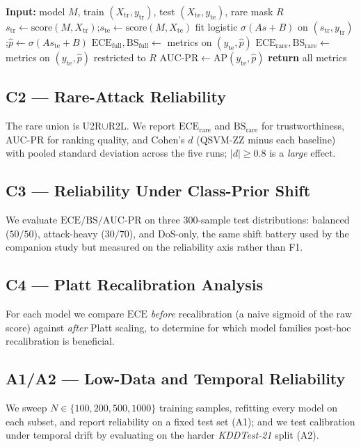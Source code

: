 \documentclass[journal]{IEEEtran}
\newcommand{\ZZ}{\textsc{ZZ}}
\newcommand{\QSVM}{QSVM-\ZZ}
\newcommand{\ECE}{\mathrm{ECE}}
\newcommand{\Brier}{\mathrm{BS}}
\begin{document}
\begin{algorithm}[t]
\caption{Uniform Platt probability and reliability metrics}
\label{alg:platt}
\begin{algorithmic}[1]
\STATE \textbf{Input:} model $M$, train $(X_{\mathrm{tr}},y_{\mathrm{tr}})$, test $(X_{\mathrm{te}},y_{\mathrm{te}})$, rare mask $R$
\STATE $s_{\mathrm{tr}}\!\gets\!\mathrm{score}(M,X_{\mathrm{tr}})$;\quad $s_{\mathrm{te}}\!\gets\!\mathrm{score}(M,X_{\mathrm{te}})$
\STATE fit logistic $\sigma(As{+}B)$ on $(s_{\mathrm{tr}},y_{\mathrm{tr}})$;\quad $\hat{p}\!\gets\!\sigma(As_{\mathrm{te}}{+}B)$
\STATE $\ECE_{\mathrm{full}},\Brier_{\mathrm{full}}\!\gets\!$ metrics on $(y_{\mathrm{te}},\hat{p})$
\STATE $\ECE_{\mathrm{rare}},\Brier_{\mathrm{rare}}\!\gets\!$ metrics on $(y_{\mathrm{te}},\hat{p})$ restricted to $R$
\STATE $\mathrm{AUC\text{-}PR}\!\gets\!\mathrm{AP}(y_{\mathrm{te}},\hat{p})$
\STATE \textbf{return} all metrics
\end{algorithmic}
\end{algorithm}

\subsection{C2 --- Rare-Attack Reliability}
The rare union is U2R$\cup$R2L. We report $\ECE_{\text{rare}}$ and
$\Brier_{\text{rare}}$ for trustworthiness, AUC-PR for ranking quality,
and Cohen's $d$ (\QSVM{} minus each baseline) with pooled standard
deviation across the five runs; $|d|\ge0.8$ is a \emph{large} effect.

\subsection{C3 --- Reliability Under Class-Prior Shift}
We evaluate $\ECE/\Brier/\text{AUC-PR}$ on three $300$-sample test
distributions: balanced ($50/50$), attack-heavy ($30/70$), and
DoS-only, the same shift battery used by the companion study but measured
on the reliability axis rather than F1.

\subsection{C4 --- Platt Recalibration Analysis}
For each model we compare $\ECE$ \emph{before} recalibration (a naive
sigmoid of the raw score) against \emph{after} Platt scaling, to
determine for which model families post-hoc recalibration is beneficial.

\subsection{A1/A2 --- Low-Data and Temporal Reliability}
We sweep $N\in\{100,200,500,1000\}$ training samples, refitting every
model on each subset, and report reliability on a fixed test set
(A1); and we test calibration under temporal drift by evaluating on the
harder \textit{KDDTest-21} split (A2).
\end{document}

